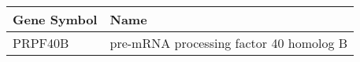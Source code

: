 \begin{tabular}{ll}
\toprule
Gene Symbol &                                    Name \\
\midrule
    PRPF40B & pre-mRNA processing factor 40 homolog B \\
\bottomrule
\end{tabular}
